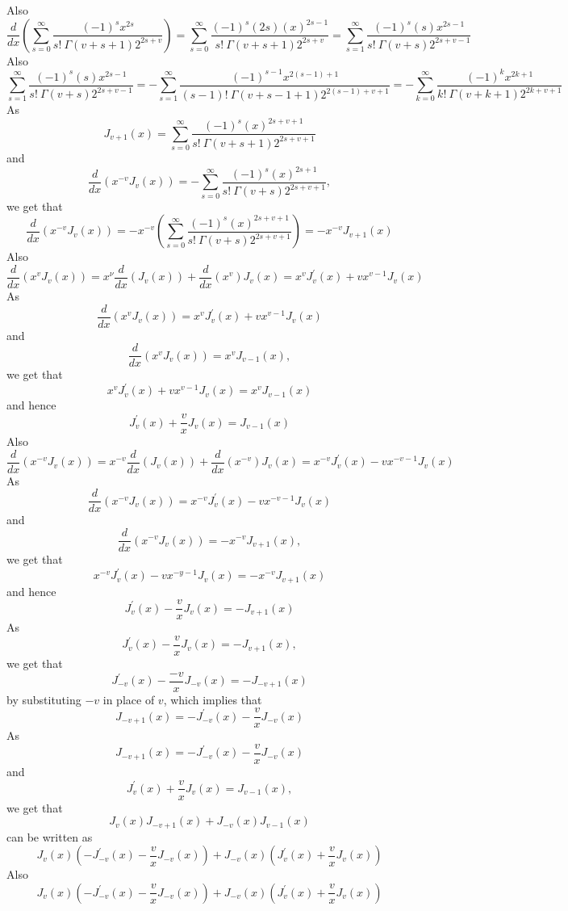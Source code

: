 \documentclass{article}
\begin{document}
\begin{flushleft}
Also 
$$\frac{d}{d x}\left(\sum_{s=0}^{\infty} \frac{(-1)^{s} x^{2 s}}{s ! \  \Gamma(v+s+1) 2^{2 s+v}}\right)=\sum_{s=0}^{\infty} \frac{(-1)^{s}(2 s)(x)^{2 s-1}}{s ! \  \Gamma(v+s+1) 2^{2 s+v}}=\sum_{s=1}^{\infty} \frac{(-1)^{s}(s) x^{2 s-1}}{s ! \  \Gamma(v+s) 2^{2 s+v-1}}$$
Also 
$$\sum_{s=1}^{\infty} \frac{(-1)^{s}(s) x^{2 s-1}}{s ! \  \Gamma(v+s) 2^{2 s+v-1}}=-\sum_{s=1}^{\infty} \frac{(-1)^{s-1} x^{2(s-1)+1}}{(s-1) ! \  \Gamma(v+s-1+1) 2^{2(s-1)+v+1}}=-\sum_{k=0}^{\infty} \frac{(-1)^{k} x^{2 k+1}}{k ! \  \Gamma(v+k+1) 2^{2 k+v+1}}$$
As 
$$J_{v+1}(x)=\sum_{s=0}^{\infty} \frac{(-1)^{s}(x)^{2 s+v+1}}{s ! \  \Gamma(v+s+1) 2^{2 s+v+1}}$$ 
and 
$$\frac{d}{d x}\left(x^{-v} J_{v}(x)\right)=-\sum_{s=0}^{\infty} \frac{(-1)^{s}(x)^{2 s+1}}{s ! \  \Gamma(v+s) 2^{2 s+v+1}},$$ 
we get that
$$\frac{d}{d x}\left(x^{-v} J_{v}(x)\right)=-x^{-v}\left(\sum_{s=0}^{\infty} \frac{(-1)^{s}(x)^{2 s+v+1}}{s ! \  \Gamma(v+s) 2^{2 s+v+1}}\right)=-x^{-v} J_{v+1}(x)$$
Also 
$$\frac{d}{d x}\left(x^{v} J_{v}(x)\right)=x^{\nu} \frac{d}{d x}\left(J_{v}(x)\right)+\frac{d}{d x}\left(x^{v}\right) J_{v}(x)=x^{v} J_{v}^{\prime}(x)+v x^{v-1} J_{v}(x)$$
As 
$$\frac{d}{d x}\left(x^{v} J_{v}(x)\right)=x^{v} J_{v}^{\prime}(x)+v x^{v-1} J_{v}(x)$$ 
and 
$$\frac{d}{d x}\left(x^{v} J_{v}(x)\right)=x^{v} J_{v-1}(x),$$
we get that
$$x^{v} J_{v}^{\prime}(x)+v x^{v-1} J_{v}(x)=x^{v} J_{v-1}(x)$$ 
and hence 
$$J_{v}^{\prime}(x)+\frac{v}{x} J_{v}(x)=J_{v-1}(x)$$
Also 
$$\frac{d}{d x}\left(x^{-v} J_{v}(x)\right)=x^{-v} \frac{d}{d x}\left(J_{v}(x)\right)+\frac{d}{d x}\left(x^{-v}\right) J_{v}(x)=x^{-v} J_{v}^{\prime}(x)-v x^{-v-1} J_{v}(x)$$
As 
$$\frac{d}{d x}\left(x^{-v} J_{v}(x)\right)=x^{-v} J_{v}^{\prime}(x)-v x^{-v-1} J_{v}(x)$$ 
and 
$$\frac{d}{d x}\left(x^{-v} J_{v}(x)\right)=-x^{-v} J_{v+1}(x),$$ 
we get that
$$x^{-v} J_{v}^{\prime}(x)-v x^{-y-1} J_{v}(x)=-x^{-v} J_{v+1}(x)$$ 
and hence 
$$J_{v}^{\prime}(x)-\frac{v}{x} J_{v}(x)=-J_{v+1}(x)$$
As 
$$J_{v}^{\prime}(x)-\frac{v}{x} J_{v}(x)=-J_{v+1}(x),$$ 
we get that 
$$J_{-v}^{\prime}(x)-\frac{-v}{x} J_{-v}(x)=-J_{-v+1}(x)$$
by substituting
$-v$ in place of $v$, which implies that 
$$J_{-v+1}(x)=-J_{-v}^{\prime}(x)-\frac{v}{x} J_{-v}(x)$$
As 
$$J_{-v+1}(x)=-J_{-v}^{\prime}(x)-\frac{v}{x} J_{-v}(x)$$ 
and 
$$J_{v}^{\prime}(x)+\frac{v}{x} J_{v}(x)=J_{v-1}(x),$$
we get that
$$J_{v}(x) J_{-v+1}(x)+J_{-v}(x) J_{v-1}(x)$$ 
can be written as
$$J_{v}(x)\left(-J_{-v}^{\prime}(x)-\frac{v}{x} J_{-v}(x)\right)+J_{-v}(x)\left(J_{v}^{\prime}(x)+\frac{v}{x} J_{v}(x)\right)$$
Also 
$$J_{v}(x)\left(-J_{-v}^{\prime}(x)-\frac{v}{x} J_{-v}(x)\right)+J_{-v}(x)\left(J_{v}^{\prime}(x)+\frac{v}{x} J_{v}(x)\right)$$ 

\end{flushleft}
\end{document}
